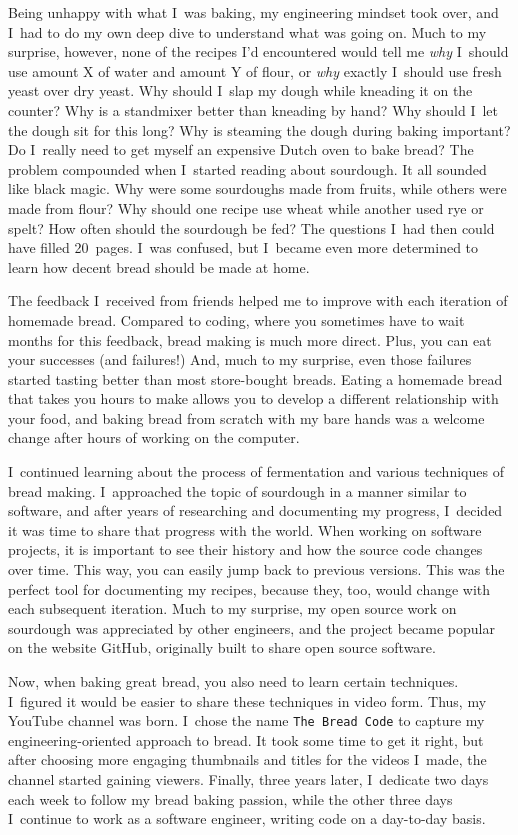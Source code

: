 Being unhappy with what I~was baking, my engineering mindset took over, and I~had
to do my own deep dive to understand what was going on. Much to my surprise, however,
none of the recipes I'd encountered would tell me \emph{why} I~should use amount X
of water and amount Y of flour, or \emph{why} exactly I~should use fresh yeast over dry yeast. Why
should I~slap my dough while kneading it on the counter? Why is a standmixer
better than kneading by hand? Why should I~let the dough sit for this long?
Why is steaming the dough during baking important? Do I~really need to
get myself an expensive Dutch oven to bake bread?
The problem compounded when I~started reading about sourdough. It all sounded like black
magic. Why were some sourdoughs made from fruits, while others were made from flour?
Why should one recipe use wheat while another used rye or spelt? How often should the
sourdough be fed? The questions I~had then could have filled 20~pages. I~was confused,
but I~became even more determined to learn how decent bread should be made at home.

The feedback I~received from friends helped me to improve with each
iteration of homemade bread. Compared to coding, where you sometimes have to wait months
for this feedback, bread making is much more direct. Plus, you can eat your successes
(and failures!) And, much to my surprise, even those failures started tasting better than
most store-bought breads. Eating a homemade bread that takes you hours to make allows you
to develop a different relationship with your food, and baking bread from scratch with my
bare hands was a welcome change after hours of working on the computer.

I~continued learning about the process of fermentation and various techniques of bread making.
I~approached the topic of sourdough in a manner similar to software, and after years of
researching and documenting my progress, I~decided it was time to share that progress with the
world.
When working on software projects, it is important to see their history and how the source
code changes over time. This way, you can easily jump back to previous versions. This was
the perfect tool for documenting my recipes, because they, too, would change with each
subsequent iteration. Much to my surprise, my open source work on sourdough was appreciated
by other engineers, and the project became popular on the website GitHub, originally built to
share open source software.

Now, when baking great bread, you also need to learn certain techniques. I~figured it would be
easier to share these techniques in video form. Thus, my YouTube channel was born. I~chose
the name \texttt{The Bread Code} to capture my engineering-oriented approach to bread. It took some
time to get it right, but after choosing more engaging thumbnails and titles for
the videos I~made, the channel started gaining viewers.
Finally, three years later, I~dedicate two days each week to follow my bread baking passion, while
the other three days I~continue to work as a software engineer, writing code on a day-to-day
basis.

